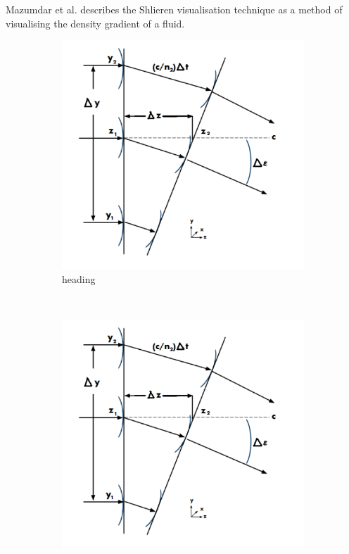 \documentclass{article}
\begin{document}
Mazumdar et al. \cite{Mazumdar_Amrita:2013} describes the Shlieren visualisation technique as a method of visualising the density gradient of a fluid.

\begin{figure}[H]
    \centering
    \begin{subfigure}[t]{0.48\textwidth}
        \centering
        \includegraphics[width=1\textwidth]{Mazumdar_Amrita_shlierien_refraction.png}
        \caption{heading}
        \label{fig:mirror_setup}
    \end{subfigure}
    ~
    \begin{subfigure}[t]{0.48\textwidth}
        \centering
        \includegraphics[width=1\textwidth]{Mazumdar_Amrita_shlierien_refraction.png}

\end{subfigure}
\end{figure}
\end{document}
